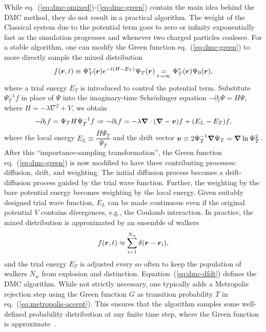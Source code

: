 While eq.~(\ref{eq:dmc-omixed})-(\ref{eq:dmc-green}) contain the main idea behind the DMC method, they do not result in a practical algorithm. The weight of the Classical system due to the potential term goes to zero or infinity exponentially fast as the simulation progresses and whenever two charged particles coalesce. For a stable algorithm, one can modify the Green function eq.~(\ref{eq:dmc-green}) to more directly sample the mixed distribution
\begin{align}
f(\boldsymbol{r},t) \equiv \Psi_T^*(\boldsymbol{r}) e^{-t(H-E_T)}\Psi_T(\boldsymbol{r}) \underset{t\rightarrow\infty}{=} \Psi_T^*(\boldsymbol{r})\Psi_0(\boldsymbol{r}),
\end{align}
where a trial energy $E_T$ is introduced to control the potential term.
Substitute $\Psi_T^{-1}f$ in place of $\Psi$ into the imaginary-time Schr\"odinger equation $-\partial_t \Psi = H\Psi$, where $H=-\lambda\nabla^2+V$, we obtain
\begin{align} \label{eq:dmc-dfdt}
-\partial_t f = \Psi_T H \Psi_T^{-1} f \Rightarrow -\partial_t f=-\lambda\boldsymbol{\nabla}\cdot(\boldsymbol{\nabla}-\boldsymbol{v})f+(E_L-E_T)f,
\end{align}
where the local energy $E_L\equiv \dfrac{H\Psi_T}{\Psi_T}$ and the drift vector $\boldsymbol{v}\equiv2\Psi_T^{-1}\boldsymbol{\nabla}\Psi_T=\boldsymbol{\nabla}\ln\Psi_T^2$.
After this ``importance-sampling transformation'', the Green function eq.~(\ref{eq:dmc-green}) is now modified to have three contributing processes: diffusion, drift, and weighting. The initial diffusion process becomes a drift-diffusion process guided by the trial wave function. Further, the weighting by the bare potential energy becomes weighting by the local energy. Given suitably designed trial wave function, $E_L$ can be made continuous even if the original potential $V$ contains divergences, e.g., the Coulomb interaction.
In practice, the mixed distribution is approximated by an ensemble of walkers
\begin{align}
f(\boldsymbol{r},t) \approx \sum\limits_{i=1}^{N_w} \delta(\boldsymbol{r}-\boldsymbol{r}_i),
\end{align}
and the trial energy $E_T$ is adjusted every so often to keep the population of walkers $N_w$ from explosion and distinction. Equation~(\ref{eq:dmc-dfdt}) defines the DMC algorithm.
While not strictly necessary, one typically adds a Metropolis rejection step using the Green function $G$ as transition probability $T$ in eq.~(\ref{eq:metropolis-accept}). This ensures that the algorithm samples some well-defined probability distribution at any finite time step, where the Green function is approximate~\cite{Reynolds1982}.

